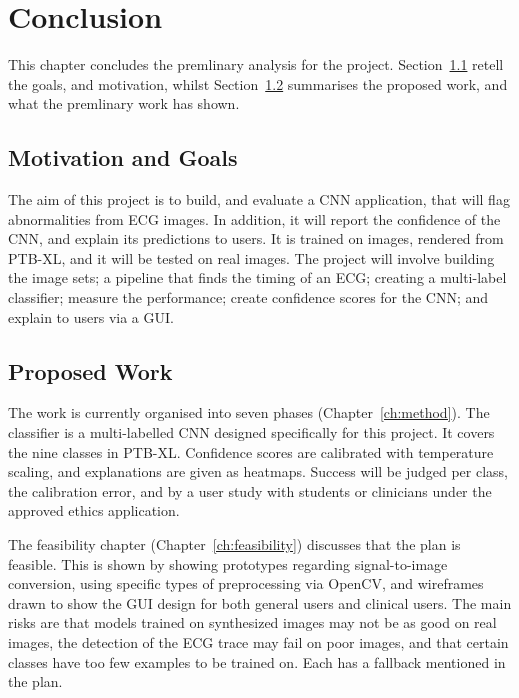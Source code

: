 \chapter{Conclusion}
\label{ch:conc}

This chapter concludes the premlinary analysis for the project. Section~\ref{sec:motivation} retell the goals, and motivation, whilst Section~\ref{sec:prop-work} summarises the proposed work, and what the premlinary work has shown.
\section{Motivation and Goals}
\label{sec:motivation}

The aim of this project is to build, and evaluate a CNN application, that will flag abnormalities from ECG images. In addition, it will report the confidence of the CNN, and explain its predictions to users. It is trained on images, rendered from PTB-XL, and it will be tested on real images. The project will involve building the image sets; a pipeline that finds the timing of an ECG; creating a multi-label classifier; measure the performance; create confidence scores for the CNN; and explain to users via a GUI.
\section{Proposed Work}
\label{sec:prop-work}

The work is currently organised into seven phases (Chapter~\ref{ch:method}). The classifier is a multi-labelled CNN designed specifically for this project. It covers the nine classes in PTB-XL. Confidence scores are calibrated with temperature scaling, and explanations are given as heatmaps. Success will be judged per class, the calibration error, and by a user study with students or clinicians under the approved ethics application.

The feasibility chapter (Chapter~\ref{ch:feasibility}) discusses that the plan is feasible. This is shown by showing prototypes regarding signal-to-image conversion, using specific types of preprocessing via OpenCV, and wireframes drawn to show the GUI design for both general users and clinical users. The main risks are that models trained on synthesized images may not be as good on real images, the detection of the ECG trace may fail on poor images, and that certain classes have too few examples to be trained on. Each has a fallback mentioned in the plan.